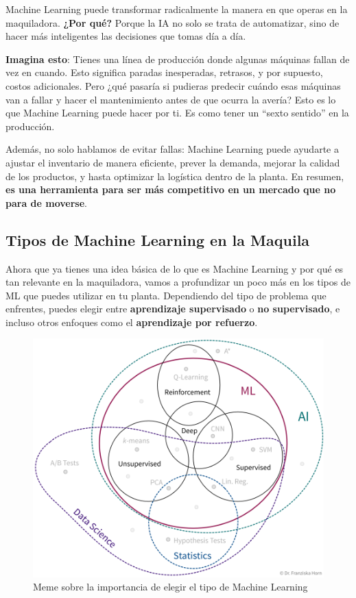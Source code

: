 Machine Learning puede transformar radicalmente la manera en que operas en la maquiladora. \textbf{¿Por qué?} Porque la IA no solo se trata de automatizar, sino de hacer más inteligentes las decisiones que tomas día a día.

\textbf{Imagina esto}: Tienes una línea de producción donde algunas máquinas fallan de vez en cuando. Esto significa paradas inesperadas, retrasos, y por supuesto, costos adicionales. Pero ¿qué pasaría si pudieras predecir cuándo esas máquinas van a fallar y hacer el mantenimiento antes de que ocurra la avería? Esto es lo que Machine Learning puede hacer por ti. Es como tener un ``sexto sentido'' en la producción.

Además, no solo hablamos de evitar fallas: Machine Learning puede ayudarte a ajustar el inventario de manera eficiente, prever la demanda, mejorar la calidad de los productos, y hasta optimizar la logística dentro de la planta. En resumen, \textbf{es una herramienta para ser más competitivo en un mercado que no para de moverse}.

\subsection{\textbf{Tipos de Machine Learning en la Maquila}}\label{tipos-de-machine-learning-en-la-maquila}

Ahora que ya tienes una idea básica de lo que es Machine Learning y por qué es tan relevante en la maquiladora, vamos a profundizar un poco más en los tipos de ML que puedes utilizar en tu planta. Dependiendo del tipo de problema que enfrentes, puedes elegir entre \textbf{aprendizaje supervisado} o \textbf{no supervisado}, e incluso otros enfoques como el \textbf{aprendizaje por refuerzo}.

\begin{figure}[H]
\centering
\begin{adjustbox}{width=\textwidth}
\includegraphics{img/imagen_21.jpg}
\end{adjustbox}
\caption{Meme sobre la importancia de elegir el tipo de Machine Learning}
\end{figure}

